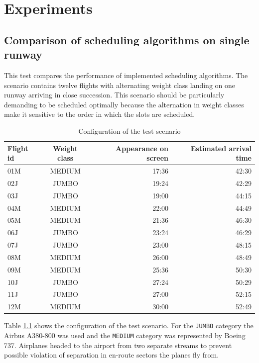 \chapter{Experiments}
\label{section:testing}


\section{Comparison of scheduling algorithms on single runway}
\label{section:1rwy-alternating}

This test compares the performance of implemented scheduling algorithms. The scenario contains twelve flights with alternating weight class landing on one runway arriving in close succession. This scenario should be particularly demanding to be scheduled optimally because the alternation in weight classes make it sensitive to the order in which the slots are scheduled.

\begin{table}[h]
  \centering
\begin{tabular}{ | l | c | r | r | }
\hline
Flight id	& Weight class	& Appearance on screen & Estimated arrival time	\\
\hline
01M	& MEDIUM	& 17:36	& 42:30	\\
02J	& JUMBO		& 19:24	& 42:29	\\
03J	& JUMBO		& 19:00	& 44:15	\\
04M	& MEDIUM	& 22:00	& 44:49	\\
05M	& MEDIUM	& 21:36	& 46:30	\\
06J	& JUMBO		& 23:24	& 46:29	\\
07J	& JUMBO		& 23:00	& 48:15	\\
08M	& MEDIUM	& 26:00	& 48:49	\\
09M	& MEDIUM	& 25:36	& 50:30	\\
10J	& JUMBO		& 27:24	& 50:29	\\
11J	& JUMBO		& 27:00	& 52:15	\\
12M	& MEDIUM	& 30:00	& 52:49	\\
\hline
\end{tabular}
  \caption{Configuration of the test scenario}
  \label{tab:config1}
\end{table}

Table \ref{tab:config1} shows the configuration of the test scenario. For the \texttt{JUMBO} category the Airbus A380-800 was used and the \texttt{MEDIUM} category was represented by Boeing 737. Airplanes headed to the airport from two separate streams to prevent possible violation of separation in en-route sectors the planes fly from.

